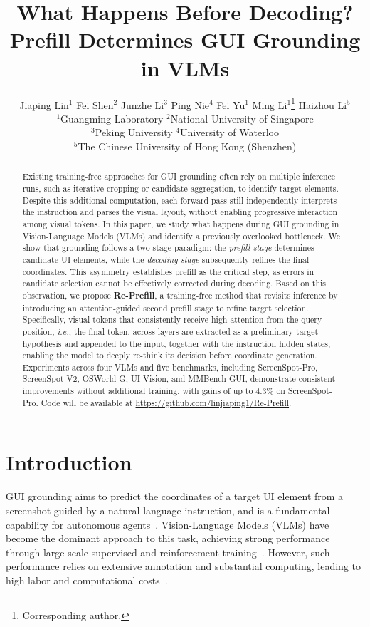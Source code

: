 \documentclass{article}
\title{What Happens Before Decoding? Prefill Determines GUI Grounding in VLMs}
\author{
Jiaping Lin$^{1}$ \quad
Fei Shen$^{2}$ \quad
Junzhe Li$^{3}$ \quad
Ping Nie$^{4}$ \quad
Fei Yu$^{1}$ \quad
Ming Li$^{1}$\thanks{Corresponding author.} \quad
Haizhou Li$^{5}$ \\[0.5em]
$^{1}$Guangming Laboratory \quad $^{2}$National University of Singapore \\
$^{3}$Peking University \quad $^{4}$University of Waterloo \\
$^{5}$The Chinese University of Hong Kong (Shenzhen) \\
}
\def\ie{\emph{i.e.}}
\begin{document}
\maketitle


\begin{abstract}
Existing training-free approaches for GUI grounding often rely on multiple inference runs, such as iterative cropping or candidate aggregation, to identify target elements.
Despite this additional computation, each forward pass still independently interprets the instruction and parses the visual layout, without enabling progressive interaction among visual tokens.
In this paper, we study what happens during GUI grounding in Vision-Language Models (VLMs) and identify a previously overlooked bottleneck.
We show that grounding follows a two-stage paradigm: the \emph{prefill stage} determines candidate UI elements, while the \emph{decoding stage} subsequently refines the final coordinates.
This asymmetry establishes prefill as the critical step, as errors in candidate selection cannot be effectively corrected during decoding.
Based on this observation, we propose \textbf{Re-Prefill}, a training-free method that revisits inference by introducing an attention-guided second prefill stage to refine target selection. 
Specifically, visual tokens that consistently receive high attention from the query position, \ie, the final token, across layers are extracted as a preliminary target hypothesis and appended to the input, together with the instruction hidden states, enabling the model to deeply re-think its decision before coordinate generation.
Experiments across four VLMs and five benchmarks, including ScreenSpot-Pro, ScreenSpot-V2, OSWorld-G, UI-Vision, and MMBench-GUI, demonstrate consistent improvements without additional training, with gains of up to 4.3\% on ScreenSpot-Pro. Code will be available at 
\url{https://github.com/linjiaping1/Re-Prefill}.
\end{abstract}



\section{Introduction}
\label{sec:intro}

GUI grounding aims to predict the coordinates of a target UI element from a screenshot guided by a natural language instruction, and is a fundamental capability for autonomous agents~\cite{survey_nguyen2025gui, survey_zhang2024large, survey_wang2024gui}.
Vision-Language Models (VLMs) have become the dominant approach to this task, achieving strong performance through large-scale supervised and reinforcement training~\citep{gta1, guig2, maiui, guiowl}.
However, such performance relies on extensive annotation and substantial computing, leading to high labor and computational costs~\cite{cogagent, osatlas, uground}.
\end{document}
